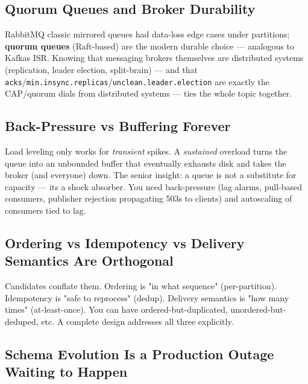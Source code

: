 \documentclass[11pt]{article}
\begin{document}
\subsection{Quorum Queues and Broker Durability}\label{quorum-queues-and-broker-durability}

RabbitMQ classic mirrored queues had data-loss edge cases under partitions; \textbf{quorum queues} (Raft-based) are the modern durable choice --- analogous to Kafka\textquotesingle s ISR. Knowing that messaging brokers themselves are distributed systems (replication, leader election, split-brain) --- and that \texttt{acks}/\texttt{min.insync.replicas}/\texttt{unclean.leader.election} are exactly the CAP/quorum dials from distributed systems --- ties the whole topic together.

\subsection{Back-Pressure vs Buffering Forever}\label{back-pressure-vs-buffering-forever}

Load leveling only works for \emph{transient} spikes. A \emph{sustained} overload turns the queue into an unbounded buffer that eventually exhausts disk and takes the broker (and everyone) down. The senior insight: a queue is not a substitute for capacity --- it\textquotesingle s a shock absorber. You need back-pressure (lag alarms, pull-based consumers, publisher rejection propagating 503s to clients) and autoscaling of consumers tied to lag.

\subsection{Ordering vs Idempotency vs Delivery Semantics Are Orthogonal}\label{ordering-vs-idempotency-vs-delivery-semantics-are-orthogonal}

Candidates conflate them. Ordering is "in what sequence" (per-partition). Idempotency is "safe to reprocess" (dedup). Delivery semantics is "how many times" (at-least-once). You can have ordered-but-duplicated, unordered-but-deduped, etc. A complete design addresses all three explicitly.

\subsection{Schema Evolution Is a Production Outage Waiting to Happen}\label{schema-evolution-is-a-production-outage-waiting-to-happen}
\end{document}
